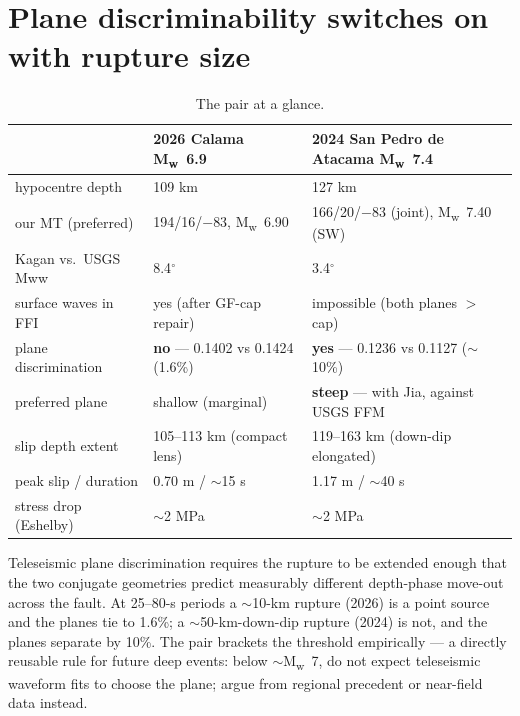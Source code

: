 \documentclass[11pt]{article}
\newcommand{\Mw}{M\textsubscript{w}}
\begin{document}
\section{Plane discriminability switches on with rupture size}
\begin{table}[H]\centering\small
\begin{tabular}{lll}
\toprule
 & 2026 Calama \Mw~6.9 & 2024 San Pedro de Atacama \Mw~7.4 \\
\midrule
hypocentre depth & 109 km & 127 km \\
our MT (preferred) & 194/16/$-$83, \Mw~6.90 & 166/20/$-$83 (joint), \Mw~7.40 (SW) \\
Kagan vs.\ USGS Mww & 8.4$^\circ$ & 3.4$^\circ$ \\
surface waves in FFI & yes (after GF-cap repair) & impossible (both planes $>$ cap) \\
plane discrimination & \textbf{no} --- 0.1402 vs 0.1424 (1.6\%) & \textbf{yes} --- 0.1236 vs 0.1127 ($\sim$10\%) \\
preferred plane & shallow (marginal) & \textbf{steep} --- with Jia, against USGS FFM \\
slip depth extent & 105--113 km (compact lens) & 119--163 km (down-dip elongated) \\
peak slip / duration & 0.70 m / $\sim$15 s & 1.17 m / $\sim$40 s \\
stress drop (Eshelby) & $\sim$2 MPa & $\sim$2 MPa \\
\bottomrule
\end{tabular}
\caption{The pair at a glance.}
\label{tab:pair}
\end{table}

Teleseismic plane discrimination requires the rupture to be extended enough that the two
conjugate geometries predict measurably different depth-phase move-out across the fault. At
25--80-s periods a $\sim$10-km rupture (2026) is a point source and the planes tie to 1.6\%;
a $\sim$50-km-down-dip rupture (2024) is not, and the planes separate by 10\%. The pair
brackets the threshold empirically --- a directly reusable rule for future deep events: below
$\sim$\Mw~7, do not expect teleseismic waveform fits to choose the plane; argue from regional
precedent or near-field data instead.
\end{document}
